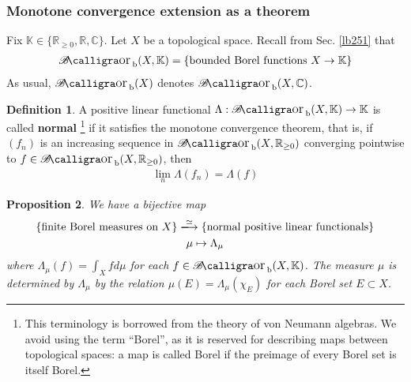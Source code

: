 \documentclass[12pt,b5paper,notitlepage]{article}
\theoremstyle{definition}
\newtheorem{df}{Definition}[subsection]
\theoremstyle{plain}
\newtheorem{pp}[df]{Proposition}
\DeclareMathOperator{\Bor}{\mathscr{B}\text{\kern -2pt {\calligra\large or}}\,}
\DeclareMathOperator{\Borb}{{\mathscr{B}\text{\kern -2pt {\calligra\large or}}\,}_{\mathrm b}}
\newcommand{\Kbb}{\mathbb K}
\newcommand{\Cbb}{\mathbb C}
\newcommand{\Rbb}{\mathbb R}
\numberwithin{equation}{section}
\begin{document}
\subsubsection{Monotone convergence extension as a theorem}

Fix $\Kbb\in\{\Rbb_{\geq0},\Rbb,\Cbb\}$. Let $X$ be a topological space. Recall from Sec. \ref{lb251} that\index{Borb@$\Bor(X,\Kbb)$}
\begin{align}
\Borb(X,\Kbb)=\{\text{bounded Borel functions }X\rightarrow\Kbb\}
\end{align}
As usual, $\Borb(X)$ denotes $\Borb(X,\Cbb)$.


\begin{df}\label{lb273}
A positive linear functional $\Lambda:\Borb(X,\Kbb)\rightarrow\Kbb$ is called \textbf{normal} \footnote{This terminology is borrowed from the theory of von Neumann algebras. We avoid using the term ``Borel'', as it is reserved for describing maps between topological spaces: a map is called Borel if the preimage of every Borel set is itself Borel.}  if it satisfies the monotone convergence theorem, that is, if $(f_n)$ is an increasing sequence in $\Borb(X,\Rbb_{\geq0})$ converging pointwise to $f\in\Borb(X,\Rbb_{\geq0})$, then
\begin{align*}
\lim_n\Lambda(f_n)=\Lambda(f)
\end{align*}
\end{df}


\begin{pp}\label{lb252}
We have a bijective map
\begin{gather}\label{eq141}
\begin{gathered}
\{\text{finite Borel measures on $X$}\}\xlongrightarrow{\simeq}\{\text{normal positive linear functionals}\}\\
\mu\mapsto\Lambda_\mu
\end{gathered}
\end{gather}
where $\Lambda_\mu(f)=\int_Xfd\mu$ for each $f\in\Borb(X,\Kbb)$. The measure $\mu$ is determined by $\Lambda_\mu$ by the relation $\mu(E)=\Lambda_\mu(\chi_E)$ for each Borel set $E\subset X$.
\end{pp}
\end{document}
